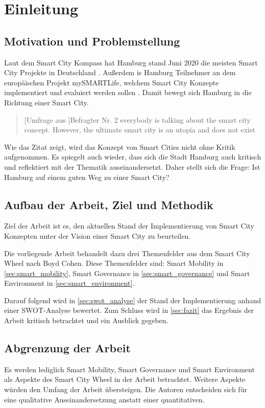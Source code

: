 \section{Einleitung}

\subsection{Motivation und Problemstellung}
Laut dem Smart City Kompass hat Hamburg stand Juni 2020 die meisten Smart City Projekte in Deutschland \autocite[vgl.][]{SmartCityKompass.ODA}.
Außerdem is Hamburg Teilnehmer an dem europäischen Projekt mySMARTLife, welchem Smart City Konzepte implementiert und evaluiert werden sollen \autocite[vgl.][S. 1ff.]{Hamburg.OD}.
Damit bewegt sich Hamburg in die Richtung einer Smart City.

\begin{quote}[Umfrage aus \autocite[S. 126]{Spil.2017}]{Befragter Nr. 2}
	\glqq everybody is talking about the smart city concept. However, the ultimate smart city is an utopia and does not exist\grqq
\end{quote}

Wie das Zitat zeigt, wird das Konzept von Smart Cities nicht ohne Kritik aufgenommen.
Es spiegelt auch wieder, dass sich die Stadt Hamburg auch kritisch und reflektiert mit der Thematik auseinandersetzt.
Daher stellt sich die Frage: Ist Hamburg auf einem guten Weg zu einer Smart City?

\subsection{Aufbau der Arbeit, Ziel und Methodik}
Ziel der Arbeit ist es, den aktuellen Stand der Implementierung von Smart City Konzepten unter der Vision einer Smart City zu beurteilen.

Die vorliegende Arbeit behandelt dazu drei Themenfelder aus dem Smart City Wheel nach Boyd Cohen.
Diese Themenfelder sind: Smart Mobility in \autoref{sec:smart_mobility}, Smart Governance in \autoref{sec:smart_governance} und Smart Environment in \autoref{sec:smart_environment}.

Darauf folgend wird in \autoref{sec:swot_analyse} der Stand der Implementierung anhand einer SWOT-Analyse bewertet.
Zum Schluss wird in \autoref{sec:fazit} das Ergebnis der Arbeit kritisch betrachtet und ein Ausblick gegeben.

\subsection{Abgrenzung der Arbeit}
Es werden lediglich Smart Mobility, Smart Governance und Smart Environment als Aspekte des Smart City Wheel in der Arbeit betrachtet. Weitere Aspekte würden den Umfang der Arbeit übersteigen. Die Autoren entscheiden sich für eine qualitative Auseinandersetzung anstatt einer quantitativen.